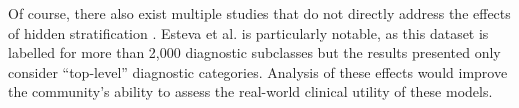 \documentclass[sigconf]{acmart}
\begin{document}
 Of course, there also exist multiple studies that do not directly address the effects of hidden stratification \citep{Haenssle2018-vw, Bien2018-ae}. 
 Esteva et al. \citep{Esteva2017-if} is particularly notable, as this dataset is labelled for more than 2,000 diagnostic subclasses but the results presented only consider ``top-level'' diagnostic categories. 
 Analysis of these effects would improve the community's ability to assess the real-world clinical utility of these models. 
 
\end{document}
